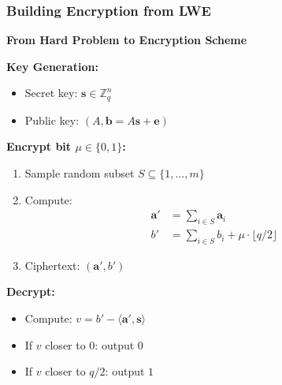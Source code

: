 \documentclass[aspectratio=169,10pt]{beamer}
\newcommand{\teaching}[1]{}
\newcommand{\slideheader}[1]{\frametitle{#1}}
\theoremstyle{plain}
\begin{document}
\begin{frame}
  \slideheader{Building Encryption from LWE}
  
  \begin{center}
    \textbf{\large From Hard Problem to Encryption Scheme}
  \end{center}
  
  \vspace{0.3cm}
  
  \begin{blueBox}
    \textbf{Key Generation:}
    \begin{itemize}
      \item Secret key: $\mathbf{s} \in \mathbb{Z}_q^n$
      \item Public key: $(A, \mathbf{b} = A\mathbf{s} + \mathbf{e})$
    \end{itemize}
  \end{blueBox}
  
  \vspace{0.2cm}
  
  \begin{redBox}
    \textbf{Encrypt bit $\mu \in \{0,1\}$:}
    \begin{enumerate}
      \item Sample random subset $S \subseteq \{1,\ldots,m\}$
      \item Compute:
        \begin{align}
          \mathbf{a}' &= \sum_{i \in S} \mathbf{a}_i\\
          b' &= \sum_{i \in S} b_i + \mu \cdot \lfloor q/2 \rfloor
        \end{align}
      \item Ciphertext: $(\mathbf{a}', b')$
    \end{enumerate}
  \end{redBox}
  
  \vspace{0.2cm}
  
  \begin{greenBox}
    \textbf{Decrypt:}
    \begin{itemize}
      \item Compute: $v = b' - \langle \mathbf{a}', \mathbf{s} \rangle$
      \item If $v$ closer to $0$: output $0$
      \item If $v$ closer to $q/2$: output $1$
    \end{itemize}
  \end{greenBox}
  
  \teaching{Show concrete encryption construction}
\end{frame}
\end{document}
